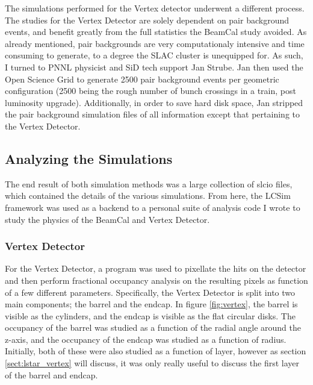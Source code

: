 \documentclass{report}
\begin{document}
                The simulations performed for the Vertex detector underwent a different process. The studies for the Vertex Detector are solely dependent on pair background events, and benefit greatly from the full statistics the BeamCal study avoided. As already mentioned, pair backgrounds are very computationaly intensive and time consuming to generate, to a degree the SLAC cluster is unequipped for. As such, I turned to PNNL physicist and SiD tech support Jan Strube. Jan then used the Open Science Grid to generate 2500 pair background events per geometric configuration (2500 being the rough number of bunch crossings in a train, post luminosity upgrade). Additionally, in order to save hard disk space, Jan stripped the pair background simulation files of all information except that pertaining to the Vertex Detector. 

            \subsection{Analyzing the Simulations}
                The end result of both simulation methods was a large collection of slcio files, which contained the details of the various simulations. From here, the LCSim framework was used as a backend to a personal suite of analysis code I wrote to study the physics of the BeamCal and Vertex Detector.
                
                \subsubsection{Vertex Detector} \label{sect:methods_vertex}
                    For the Vertex Detector, a program was used to pixellate the hits on the detector and then perform fractional occupancy analysis on the resulting pixels as function of a few different parameters. Specifically, the Vertex Detector is split into two main components; the barrel and the endcap. In figure \ref{fig:vertex}, the barrel is visible as the cylinders, and the endcap is visible as the flat circular disks. The occupancy of the barrel was studied as a function of the radial angle around the z-axis, and the occupancy of the endcap was studied as a function of radius. Initially, both of these were also studied as a function of layer, however as section \ref{sect:lstar_vertex} will discuss, it was only really useful to discuss the first layer of the barrel and endcap.
\end{document}
